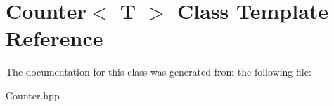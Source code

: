 \hypertarget{class_counter}{}\section{Counter$<$ T $>$ Class Template Reference}
\label{class_counter}


The documentation for this class was generated from the following file\+:\begin{DoxyCompactItemize}
\item 
Counter.\+hpp\end{DoxyCompactItemize}
